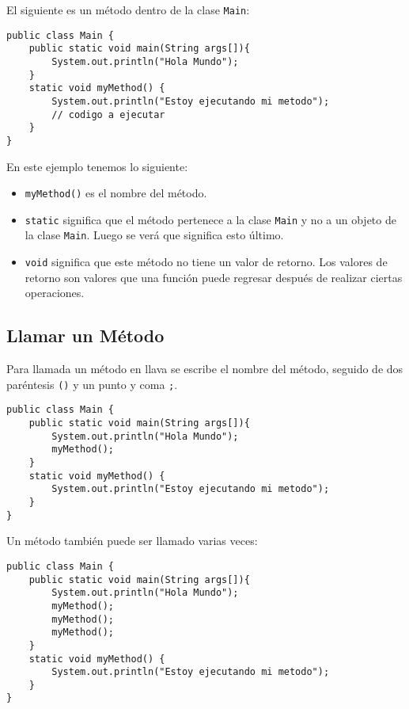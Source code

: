 \documentclass[12pt]{article}
\newcounter{it}
\theoremstyle{largebreak}
\begin{document}
    \begin{exa}
        El siguiente es un método dentro de la clase \lstinline|Main|:
        \begin{lstlisting}[caption={Método dentro de \lstinline|Main|.},label=DescriptiveLabel]
public class Main {
    public static void main(String args[]){
        System.out.println("Hola Mundo");
    }
    static void myMethod() {
        System.out.println("Estoy ejecutando mi metodo");
        // codigo a ejecutar
    }
}
        \end{lstlisting}
        En este ejemplo tenemos lo siguiente:
        \begin{itemize}
            \item \lstinline|myMethod()| es el nombre del método.
            \item \lstinline|static| significa que el método pertenece a la clase \lstinline|Main| y no a un objeto de la clase \lstinline|Main|. Luego se verá que significa esto último.
            \item \lstinline|void| significa que este método no tiene un valor de retorno. Los valores de retorno son valores que una función puede regresar después de realizar ciertas operaciones.
        \end{itemize}
    \end{exa}

    \subsection{Llamar un Método}

    Para llamada un método en llava se escribe el nombre del método, seguido de dos paréntesis \lstinline|()| y un punto y coma \lstinline|;|.

    \begin{exa}
        \begin{lstlisting}[caption={Método dentro de \lstinline|Main|.},label=DescriptiveLabel]
public class Main {
    public static void main(String args[]){
        System.out.println("Hola Mundo");
        myMethod();
    }
    static void myMethod() {
        System.out.println("Estoy ejecutando mi metodo");
    }
}
        \end{lstlisting}

        Un método también puede ser llamado varias veces:
        \begin{lstlisting}[caption={Método llamado varias veces.},label=DescriptiveLabel]
public class Main {
    public static void main(String args[]){
        System.out.println("Hola Mundo");
        myMethod();
        myMethod();
        myMethod();
    }
    static void myMethod() {
        System.out.println("Estoy ejecutando mi metodo");
    }
}
        \end{lstlisting}
    \end{exa}
\end{document}
